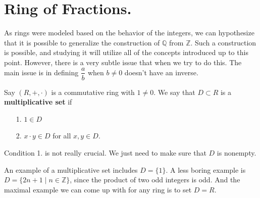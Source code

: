     \newpage
    \section{Ring of Fractions.}
    As rings were modeled based on the behavior of the integers,
    we can hypothesize that it is possible to generalize the
    construction of $\mathbb{Q}$ from 
    $\mathbb{Z}$. Such a construction is possible, and studying it
    will utilize all of the concepts introduced up to this point. 
    However, there is a very subtle issue that
    when we try to do this. The main issue is in defining
    $\dfrac{a}{b}$ when $b \ne 0 $ doesn't have an inverse.
    
    \begin{definition}
        Say $(R, +, \cdot)$ is a commutative ring with $1 \ne 0$.
        We say that $D \subset R$ is a \textbf{multiplicative set}
        if 
        \begin{itemize}
            \item[1.] $1 \in D$
            \item[2.] $x \cdot y \in D$ for all $x, y \in D$.  
        \end{itemize}
        Condition 1. is not really crucial. We just need to make
        sure that $D$ is nonempty. 
    \end{definition}
    An example of a multiplicative set includes $D = \{1\}$. A
    less boring example is $D = \{2n+1 \mid n \in \mathbb{Z}\}$,
    since the product of two odd integers is odd. And the maximal
    example we can come up with for any ring is to set $D = R$. 

